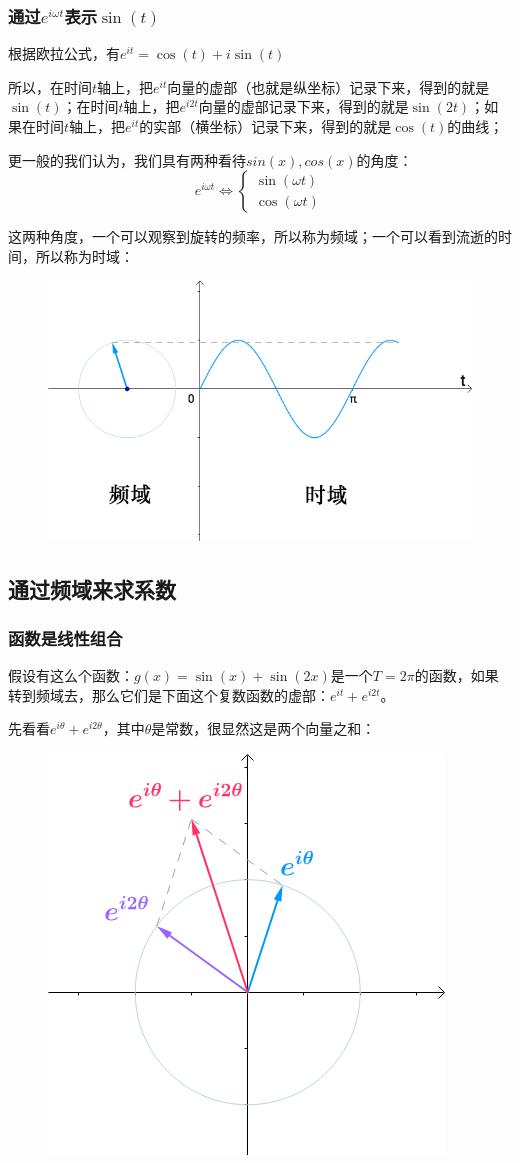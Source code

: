 \documentclass[12pt]{article}
\begin{document}
\subsubsection{通过$e^{i\omega t}$表示$\sin(t)$}
根据欧拉公式，有$e^{it} = \cos(t)+i\sin(t)$

所以，在时间$t$轴上，把$e^{it}$向量的虚部（也就是纵坐标）记录下来，得到的就是$\sin(t)$；在时间$t$轴上，把$e^{i2t}$向量的虚部记录下来，得到的就是$\sin(2t)$；如果在时间$t$轴上，把$e^{it}$的实部（横坐标）记录下来，得到的就是$\cos(t)$的曲线；

更一般的我们认为，我们具有两种看待$sin(x),cos(x)$的角度：
$$
e^{i\omega t} \Longleftrightarrow \begin{cases}
\sin(\omega t)\\
\cos(\omega t)
\end{cases}
$$

这两种角度，一个可以观察到旋转的频率，所以称为频域；一个可以看到流逝的时间，所以称为时域：
\begin{figure}[H]
  \centering
  \includegraphics[width=.5\textwidth]{fig/频域和时域对比图.png} 
\end{figure}

\subsection{通过频域来求系数}
\subsubsection{函数是线性组合}
假设有这么个函数：$g(x)=\sin(x)+\sin(2x)$是一个$T=2\pi$的函数，如果转到频域去，那么它们是下面这个复数函数的虚部：$e^{it}+e^{i2t}$。

先看看$e^{i\theta}+e^{i2\theta}$，其中$\theta$是常数，很显然这是两个向量之和：
\begin{figure}[H]
  \centering
  \includegraphics[width=.5\textwidth]{fig/eitheta向量和.png} 
\end{figure}
\end{document}
